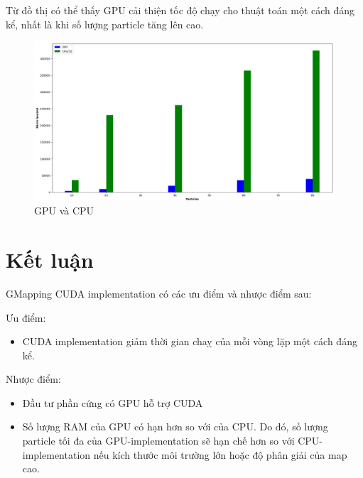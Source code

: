 \documentclass[../../main.tex]{subfiles}
\begin{document}
Từ đồ thị có thể thấy GPU cải thiện tốc độ chạy cho thuật toán một cách đáng kể, nhất là khi số lượng particle tăng lên cao.
\begin{figure}[H]
    \begin{center}
        \includegraphics[scale=0.3]{gpu_vs_cpu.png}
    \end{center}
    \caption{GPU và CPU}
    \label{fig:gpu_vs_cpu}
\end{figure}

\section{Kết luận}
GMapping CUDA implementation có các ưu điểm và nhược điểm sau:

Ưu điểm:
\begin{itemize}
    \item CUDA implementation giảm thời gian chaỵ của mỗi vòng lặp một cách đáng kể.
\end{itemize}

Nhược điểm:
\begin{itemize}
    \item Đầu tư phần cứng có GPU hỗ trợ CUDA
    \item Số lượng RAM của GPU có hạn hơn so với của CPU. Do đó, số lượng particle tối đa của GPU-implementation sẽ hạn chế hơn so với CPU-implementation nếu kích thước môi trường lớn hoặc độ phân giải của map cao.
\end{itemize}
\end{document}
